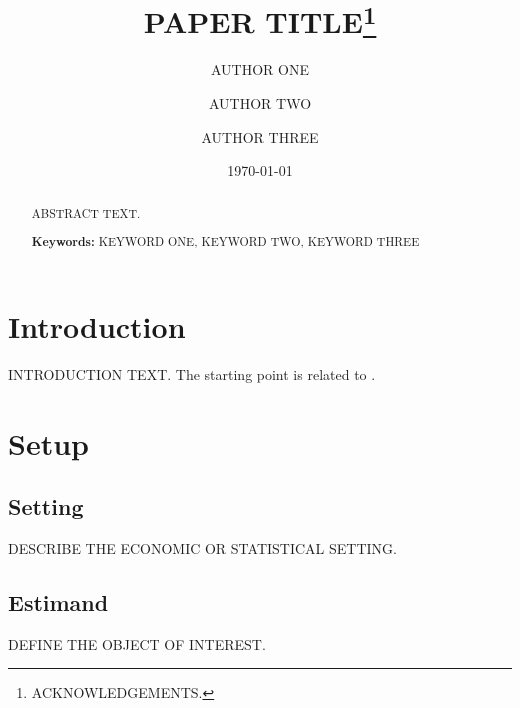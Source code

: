 \documentclass[english, 12pt, a4paper]{article}
\date{\today}
\begin{document}

\title{PAPER TITLE\thanks{ACKNOWLEDGEMENTS.}}

\author{AUTHOR ONE \and AUTHOR TWO \and AUTHOR THREE}

\maketitle

\begin{abstract}
ABSTRACT TEXT.
\smallskip

\textbf{Keywords:} KEYWORD ONE, KEYWORD TWO, KEYWORD THREE

\end{abstract}

\newpage

\section{Introduction}

INTRODUCTION TEXT. The starting point is related to \cite{gentzkow2019measuring}.  %

\section{Setup}

\subsection{Setting}

DESCRIBE THE ECONOMIC OR STATISTICAL SETTING.

\subsection{Estimand}

DEFINE THE OBJECT OF INTEREST.
\end{document}
